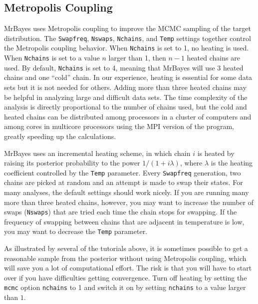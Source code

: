 \documentclass[12pt]{book}
\begin{document}

\subsection{Metropolis Coupling}
\label{metropolisCoupling}

MrBayes uses Metropolis coupling to improve the MCMC sampling of the target distribution. The
\texttt{Swapfreq}, \texttt{Nswaps}, \texttt{Nchains}, and \texttt{Temp} settings together control
the Metropolis coupling behavior. When \texttt{Nchains} is set to 1, no heating is used. When
\texttt{Nchains} is set to a value $n$ larger than 1, then $n - 1$ heated chains are used. By
default, \texttt{Nchains} is set to 4, meaning that MrBayes will use 3 heated chains and one
``cold'' chain. In our experience, heating is essential for some data sets but it is not needed for
others. Adding more than three heated chains may be helpful in analyzing large and difficult data
sets. The time complexity of the analysis is directly proportional to the number of chains used,
but the cold and heated chains can be distributed among processors in a cluster of computers and
among cores in multicore processors using the MPI version of the program, greatly speeding up the
calculations.

MrBayes uses an incremental heating scheme, in which chain $i$ is heated by raising its posterior
probability to the power $1/ (1 + i\lambda)$, where $\lambda$ is the heating coefficient controlled
by the \texttt{Temp} parameter. Every \texttt{Swapfreq} generation, two chains are picked at random
and an attempt is made to swap their states. For many analyses, the default settings should work
nicely. If you are running many more than three heated chains, however, you may want to increase
the number of swaps (\texttt{Nswaps}) that are tried each time the chain stops for swapping. If the
frequency of swapping between chains that are adjacent in temperature is low, you may want to
decrease the \texttt{Temp} parameter.

As illustrated by several of the tutorials above, it is sometimes possible to get a reasonable
sample from the posterior without using Metropolis coupling, which will save you a lot of
computational effort. The risk is that you will have to start over if you have difficulties getting
convergence. Turn off heating by setting the \texttt{mcmc} option \texttt{nchains} to 1 and switch
it on by setting \texttt{nchains} to a value larger than $1$.
\end{document}
